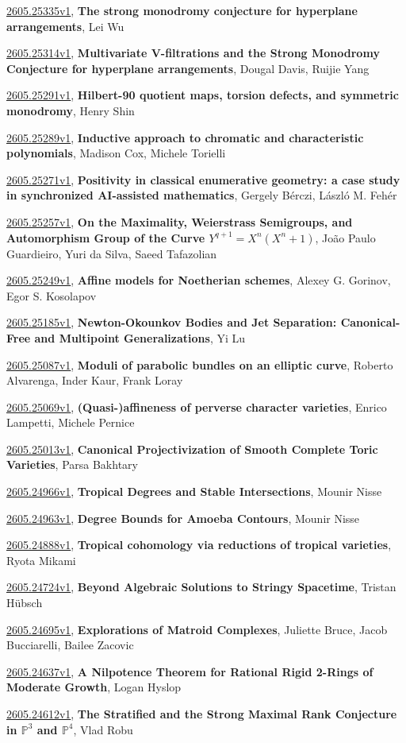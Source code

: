 \documentclass[9pt, a4paper]{article}
\theoremstyle{plain}
\theoremstyle{definition}
\theoremstyle{remark}
\newcommand{\arxiv}[3]{\href{https://arxiv.org/abs/#1}{#1}, \textbf{\textcolor{arxivblue}{#2}}, #3}
\begin{document}
\arxiv{2605.25335v1}{The strong monodromy conjecture for hyperplane arrangements}{Lei Wu}

\arxiv{2605.25314v1}{Multivariate V-filtrations and the Strong Monodromy Conjecture for hyperplane arrangements}{Dougal Davis, Ruijie Yang}

\arxiv{2605.25291v1}{Hilbert-90 quotient maps, torsion defects, and symmetric monodromy}{Henry Shin}

\arxiv{2605.25289v1}{Inductive approach to chromatic and characteristic polynomials}{Madison Cox, Michele Torielli}

\arxiv{2605.25271v1}{Positivity in classical enumerative geometry: a case study in synchronized AI-assisted mathematics}{Gergely Bérczi, László M. Fehér}

\arxiv{2605.25257v1}{On the Maximality, Weierstrass Semigroups, and Automorphism Group of the Curve $Y^{q+1} = X^n(X^n + 1)$}{João Paulo Guardieiro, Yuri da Silva, Saeed Tafazolian}

\arxiv{2605.25249v1}{Affine models for Noetherian schemes}{Alexey G. Gorinov, Egor S. Kosolapov}

\arxiv{2605.25185v1}{Newton-Okounkov Bodies and Jet Separation: Canonical-Free and Multipoint Generalizations}{Yi Lu}

\arxiv{2605.25087v1}{Moduli of parabolic bundles on an elliptic curve}{Roberto Alvarenga, Inder Kaur, Frank Loray}

\arxiv{2605.25069v1}{(Quasi-)affineness of perverse character varieties}{Enrico Lampetti, Michele Pernice}

\arxiv{2605.25013v1}{Canonical Projectivization of Smooth Complete Toric Varieties}{Parsa Bakhtary}

\arxiv{2605.24966v1}{Tropical Degrees and Stable Intersections}{Mounir Nisse}

\arxiv{2605.24963v1}{Degree Bounds for Amoeba Contours}{Mounir Nisse}

\arxiv{2605.24888v1}{Tropical cohomology via reductions of tropical varieties}{Ryota Mikami}

\arxiv{2605.24724v1}{Beyond Algebraic Solutions to Stringy Spacetime}{Tristan Hübsch}

\arxiv{2605.24695v1}{Explorations of Matroid Complexes}{Juliette Bruce, Jacob Bucciarelli, Bailee Zacovic}

\arxiv{2605.24637v1}{A Nilpotence Theorem for Rational Rigid 2-Rings of Moderate Growth}{Logan Hyslop}

\arxiv{2605.24612v1}{The Stratified and the Strong Maximal Rank Conjecture in $\mathbb{P}^3$ and $\mathbb{P}^4$}{Vlad Robu}
\end{document}
